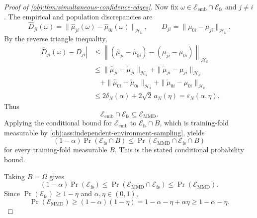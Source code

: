 \documentclass[11pt]{article}
\begin{document}
\begin{proof}[Proof of \cref{obj:thm:simultaneous-confidence-edges}]
Now fix \(\omega\in\mathcal E_{\mathrm{emb}}\cap\mathcal E_{\mathrm{fs}}\) and \(j\ne i\).  The empirical and population discrepancies are
\[
\widehat D_{ji}(\omega)
=
\|\widehat\mu_{j i}(\omega)-\widehat\mu_{0 i}(\omega)\|_{\mathcal H_k},
\qquad
D_{ji}
=
\|\mu_{0 i}-\mu_{j i}\|_{\mathcal H_k}.
\]
By the reverse triangle inequality,
\[
\begin{aligned}
|\widehat D_{ji}(\omega)-D_{ji}|
&\le
\left\|
(\widehat\mu_{j i}-\widehat\mu_{0 i})
-
(\mu_{j i}-\mu_{0 i})
\right\|_{\mathcal H_k}                                                    \\
&\le
\|\widehat\mu_{j i}-\widetilde\mu_{j i}\|_{\mathcal H_k}
+
\|\widetilde\mu_{j i}-\mu_{j i}\|_{\mathcal H_k}                            \\
&\quad+
\|\widehat\mu_{0 i}-\widetilde\mu_{0 i}\|_{\mathcal H_k}
+
\|\widetilde\mu_{0 i}-\mu_{0 i}\|_{\mathcal H_k}                            \\
&\le
2\delta_N(\alpha)+2\sqrt2\,a_N(\eta)
=
\varepsilon_N(\alpha,\eta).
\end{aligned}
\]
Thus
\[
\mathcal E_{\mathrm{emb}}\cap\mathcal E_{\mathrm{fs}}
\subseteq
\mathcal E_{\mathrm{MMD}}.
\]
Applying the conditional bound for \(\mathcal E_{\mathrm{emb}}\) to \(\mathcal E_{\mathrm{fs}}\cap B\), which is training-fold measurable by \cref{obj:ass:independent-environment-sampling}, yields
\[
(1-\alpha)\Pr(\mathcal E_{\mathrm{fs}}\cap B)
\le
\Pr(\mathcal E_{\mathrm{MMD}}\cap\mathcal E_{\mathrm{fs}}\cap B)
\]
for every training-fold measurable \(B\).  This is the stated conditional probability bound.

Taking \(B=\Omega\) gives
\[
(1-\alpha)\Pr(\mathcal E_{\mathrm{fs}})
\le
\Pr(\mathcal E_{\mathrm{MMD}}\cap\mathcal E_{\mathrm{fs}})
\le
\Pr(\mathcal E_{\mathrm{MMD}}).
\]
Since \(\Pr(\mathcal E_{\mathrm{fs}})\ge 1-\eta\) and
\(\alpha,\eta\in(0,1)\),
\[
\Pr(\mathcal E_{\mathrm{MMD}})
\ge
(1-\alpha)(1-\eta)
=
1-\alpha-\eta+\alpha\eta
\ge
1-\alpha-\eta.
\]


\end{proof}
\end{document}
